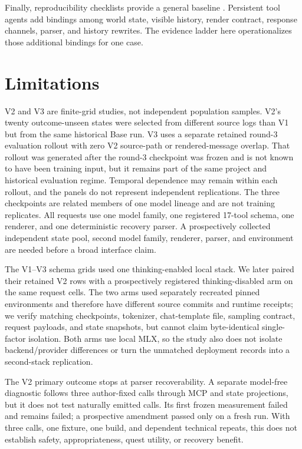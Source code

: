 \documentclass[10pt]{article}
\begin{document}
Finally, reproducibility checklists provide a general baseline
\citep{pineau2021reproducibility}. Persistent tool agents add bindings among
world state, visible history, render contract, response channels, parser, and
history rewrites. The evidence ladder here operationalizes those additional
bindings for one case.

\section{Limitations}

V2 and V3 are finite-grid studies, not independent population samples. V2's
twenty outcome-unseen states were selected from different source logs than V1
but from the same historical Base run. V3 uses a separate retained round-3
evaluation rollout with zero V2 source-path or rendered-message overlap. That
rollout was generated after the round-3 checkpoint was frozen and is not known
to have been training input, but it remains part of the same project and
historical evaluation regime. Temporal dependence may remain within each
rollout, and the panels do not represent independent replications. The three
checkpoints are related members of one model lineage and are not training
replicates. All requests use one model family, one registered 17-tool schema,
one renderer, and one deterministic recovery parser. A prospectively collected
independent state pool, second model family, renderer, parser, and environment
are needed before a broad interface claim.

The V1--V3 schema grids used one thinking-enabled local stack. We later paired
their retained V2 rows with a prospectively registered thinking-disabled arm on
the same request cells. The two arms used separately recreated pinned
environments and therefore have different source commits and runtime receipts;
we verify matching checkpoints, tokenizer, chat-template file, sampling
contract, request payloads, and state snapshots, but cannot claim byte-identical
single-factor isolation. Both arms use local MLX, so the study also does not
isolate backend/provider differences or turn the unmatched deployment records
into a second-stack replication.

The V2 primary outcome stops at parser recoverability. A separate model-free
diagnostic follows three author-fixed calls through MCP and state projections,
but it does not test naturally emitted calls. Its first frozen measurement
failed and remains failed; a prospective amendment passed only on a fresh run.
With three calls, one fixture, one build, and dependent technical repeats, this
does not establish safety, appropriateness, quest utility, or recovery benefit.
\end{document}
